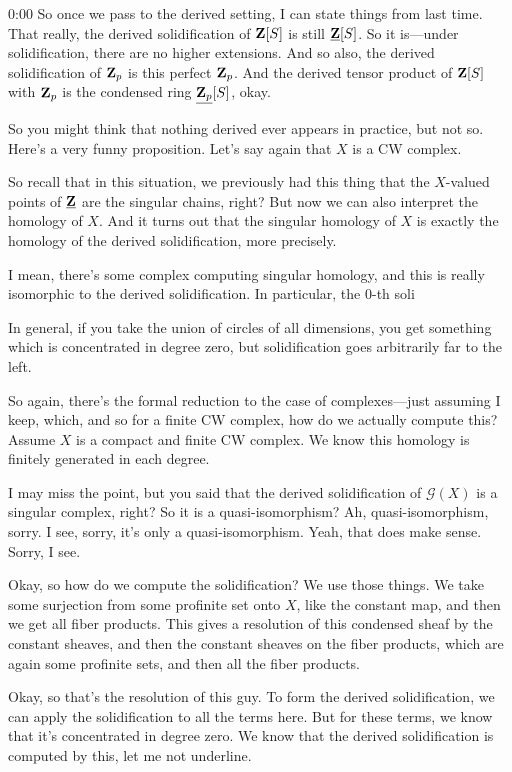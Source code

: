 \begin{unfinished}{0:00}
So once we pass to the derived setting, I can state things from last time. That really, the derived solidification of $\mathbf Z[S]$ is still $\underline{\mathbf Z}[S]$. So it is---under solidification, there are no higher extensions. And so also, the derived solidification of $\mathbf Z_p$ is this perfect $\mathbf Z_p$. And the derived tensor product of $\mathbf Z[S]$ with $\mathbf Z_p$ is the condensed ring $\underline{\mathbf Z_p}[S]$, okay.

So you might think that nothing derived ever appears in practice, but not so. Here's a very funny proposition. Let's say again that $X$ is a CW complex.

So recall that in this situation, we previously had this thing that the $X$-valued points of $\underline{\mathbf Z}$ are the singular chains, right? But now we can also interpret the homology of $X$. And it turns out that the singular homology of $X$ is exactly the homology of the derived solidification, more precisely.

I mean, there's some complex computing singular homology, and this is really isomorphic to the derived solidification. In particular, the $0$-th soli

In general, if you take the union of circles of all dimensions, you get something which is concentrated in degree zero, but solidification goes arbitrarily far to the left.

So again, there's the formal reduction to the case of complexes---just assuming I keep, which, and so for a finite CW complex, how do we actually compute this? Assume $X$ is a compact and finite CW complex. We know this homology is finitely generated in each degree.

I may miss the point, but you said that the derived solidification of $\mathcal{G}(X)$ is a singular complex, right? So it is a quasi-isomorphism? Ah, quasi-isomorphism, sorry. I see, sorry, it's only a quasi-isomorphism. Yeah, that does make sense. Sorry, I see.

Okay, so how do we compute the solidification? We use those things. We take some surjection from some profinite set onto $X$, like the constant map, and then we get all fiber products. This gives a resolution of this condensed sheaf by the constant sheaves, and then the constant sheaves on the fiber products, which are again some profinite sets, and then all the fiber products.

Okay, so that's the resolution of this guy. To form the derived solidification, we can apply the solidification to all the terms here. But for these terms, we know that it's concentrated in degree zero. We know that the derived solidification is computed by this, let me not underline.


\end{unfinished}
